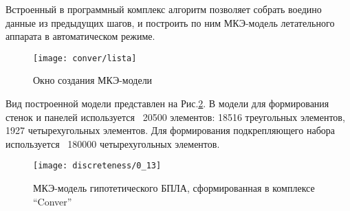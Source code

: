  

 Встроенный в программный комплекс алгоритм позволяет собрать воедино данные из предыдущих шагов, и построить по ним МКЭ-модель летательного аппарата в автоматическом режиме. 

\begin{figure}[H]
\centering
\texttt{[image: conver/lista]}
\caption{Окно создания МКЭ-модели}
\label{fig:conver_lista}
\end{figure}


Вид построенной модели представлен на Рис.\ref{fig:converReadyModel}. В модели для формирования стенок и панелей используется ~20500  элементов: 18516 треугольных элементов, 1927 четырехугольных элементов. Для формирования подкрепляющего набора используется ~180000 четырехугольных элементов.  


\begin{figure}[ht]
\centering
\texttt{[image: discreteness/0\_13]}
\caption{МКЭ-модель гипотетического БПЛА, сформированная в комплексе ``Conver''}
\label{fig:converReadyModel}
\end{figure}
